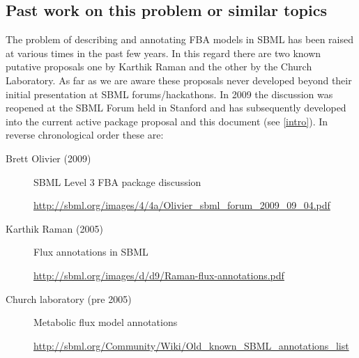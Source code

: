\subsection{Past work on this problem or similar topics}
The problem of describing and annotating FBA models in SBML has been raised
at various times in the past few years. In this regard there are two known
putative proposals one by Karthik Raman and the other by the Church
Laboratory. As far as we are aware these proposals never developed beyond
their initial presentation at SBML forums/hackathons. In 2009 the discussion
was reopened at the SBML Forum held in Stanford and has subsequently
developed into the current active package proposal and this document (see
\ref{intro}). In reverse chronological order these are:
%
\begin{description}
  \item[Brett Olivier (2009)] SBML Level 3 FBA package discussion
  \item[]\url{http://sbml.org/images/4/4a/Olivier_sbml_forum_2009_09_04.pdf}
  \item[Karthik Raman (2005)] Flux annotations in SBML
  \item[]\url{http://sbml.org/images/d/d9/Raman-flux-annotations.pdf}
  \item[Church laboratory (pre 2005)] Metabolic flux model annotations
  \item[]\url{http://sbml.org/Community/Wiki/Old_known_SBML_annotations_list}
\end{description}


